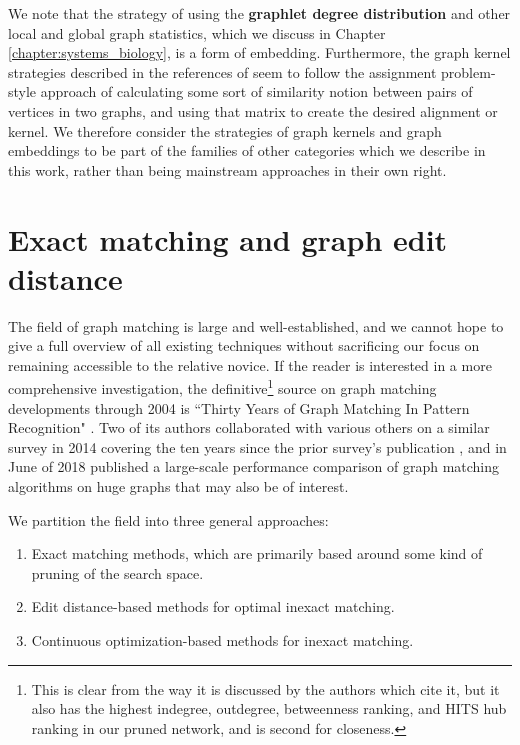 \documentclass[12pt]{thesis}
\theoremstyle{plain}
\theoremstyle{definition}
\theoremstyle{remark}
\begin{document}
We note that the strategy of using the \textbf{graphlet degree distribution} and other local and global graph statistics, which we discuss in Chapter \ref{chapter:systems_biology}, is a form of embedding. Furthermore, the graph kernel strategies described in the references of  \cite{Livi_2012} seem to follow the assignment problem-style approach of calculating some sort of similarity notion between pairs of vertices in two graphs, and using that matrix to create the desired alignment or kernel. We therefore consider the strategies of graph kernels and graph embeddings to be part of the families of other categories which we describe in this work, rather than being mainstream approaches in their own right.








\section{Exact matching and graph edit distance}

The field of graph matching is large and well-established, and we cannot hope to give a full overview of all existing techniques without sacrificing our focus on remaining accessible to the relative novice. If the reader is interested in a more comprehensive investigation, the definitive\footnote{This is clear from the way it is discussed by the authors which cite it, but it also has the highest indegree, outdegree, betweenness ranking, and HITS hub ranking in our pruned network, and is second for closeness.} source on graph matching developments through 2004 is ``Thirty Years of Graph Matching In Pattern Recognition" \cite{Conte_2004}. Two of its authors collaborated with various others on a similar survey in 2014 covering the ten years since the prior survey's publication \cite{foggia2014graph}, and in June of 2018 published a large-scale performance comparison of graph matching algorithms on huge graphs \cite{carletti2018comparing} that may also be of interest.

We partition the field into three general approaches: 

\begin{enumerate}
\item Exact matching methods, which are primarily based around some kind of pruning of the search space.
\item Edit distance-based methods for optimal inexact matching. 
\item Continuous optimization-based methods for inexact matching. 
\end{enumerate}
\end{document}
